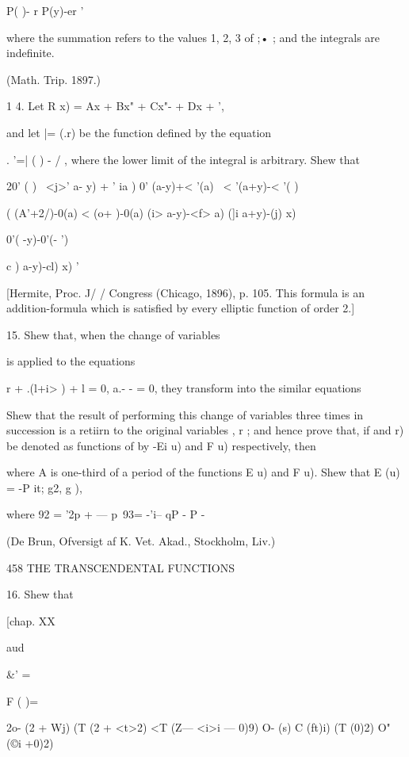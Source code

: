 { P( )- r  P(y)-er  ' 

where the summation refers to the values 1, 2, 3 of ;• ; and the integrals are indefinite. 

(Math. Trip. 1897.) 

1 4. Let R  x) = Ax  + Bx"  + Cx"- + Dx +  ', 

and let |=  (.r) be the function defined by the equation 

. '=| ( ) - / , 
where the lower limit of the integral is arbitrary. Shew that 

20' ( ) \  <j>'   a- y) +  ' ia )   0' (a-y)+< '(a) \  < '(a+y)-< '( ) 

( (A'+2/)-0(a) < (o+ )-0(a) (i> a-y)-<f> a) (]i a+y)-(j)  x) 

0'( -y)-0'(- ') 

c ) a-y)-cl) x) ' 

[Hermite, Proc. J/  /  Congress (Chicago, 1896), p. 105. This formula is an 
addition-formula which is satisfied by every elliptic function of order 2.] 

15. Shew that, when the change of variables 

is applied to the equations 

r + .(l+i> ) + l  = 0, a.- -  = 0, 
they transform into the similar equations 

Shew that the result of performing this change of variables three times in succession 
is a retiirn to the original variables  , r  ; and hence prove that, if   and r) be denoted as 
functions of   by -Ei u) and F u) respectively, then 

where A is one-third of a period of the functions E u) and F u). 
Shew that E (u) =  -P it; g2, g ), 

where 92 = '2p + — p\ 93= -'i-- qP - P - 

(De Brun, Ofversigt af K. Vet. Akad., Stockholm, Liv.) 



458 THE TRANSCENDENTAL FUNCTIONS 

16. Shew that 



[chap. XX 



aud 



\&'   = 



F ( )= 



2o- (2 + Wj) (T (2 + <t>2) <T (Z— <i>i — 0)9) 
O-  (s) C (ft)i) (T (0)2) O" (©i +0)2) 

}
